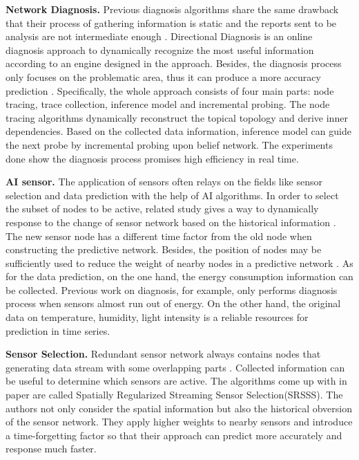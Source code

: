\textbf{Network Diagnosis.}
Previous diagnosis algorithms share the same drawback 
that their process of gathering information is static and the reports sent to be 
analysis are not intermediate enough \cite{Ramanathan2005Sympathy,Khan2010Diagnostic}. 
Directional Diagnosis \cite{gong2015directional} is an online diagnosis approach to dynamically 
recognize the most useful information according to an engine designed in the approach. 
Besides, the diagnosis process only focuses on the problematic area, 
thus it can produce a more accuracy prediction \cite{Pavlou2015How}. 
Specifically, the whole approach consists of four main parts: 
node tracing, trace collection, inference model and incremental probing. 
The node tracing algorithms dynamically reconstruct the topical topology and derive inner dependencies. 
Based on the collected data information, inference model can guide the next probe 
by incremental probing upon belief network. The experiments done show the diagnosis 
process promises high efficiency in real time.

\textbf{AI sensor.}
The application of sensors often relays on the fields 
like sensor selection and data prediction with the help of AI algorithms. 
In order to select the subset of nodes to be active, related study gives a way to dynamically 
response to the change of sensor network based on the historical information \cite{Mo2013Dynamic}.
The new sensor node has a different time factor from the old 
node when constructing the predictive network. 
Besides, the position of nodes may be sufficiently used to reduce the weight of 
nearby nodes in a predictive network \cite{Kumar2017Edge}. 
As for the data prediction, on the one hand, the energy consumption information 
can be collected. Previous work on diagnosis, for example, only performs 
diagnosis process when sensors almost run out of energy. On the other hand, the original 
data on temperature, humidity, light intensity is a reliable resources for 
prediction in time series\cite{Raza2014Practical}. 

\textbf{Sensor Selection.}
Redundant sensor network always contains nodes that generating data 
stream with some overlapping parts \cite{Ali1995Redundant}. 
Collected information can be useful to determine which sensors are active. 
The algorithms come up with in paper\cite{li2016spatially} are called Spatially Regularized Streaming Sensor Selection(SRSSS). 
The authors not only consider the spatial information but also the historical obversion of the sensor network. 
They apply higher weights to nearby sensors and introduce a time-forgetting factor \cite{Astrom1989Adaptive} so that their approach can predict more accurately and response much faster.
	
